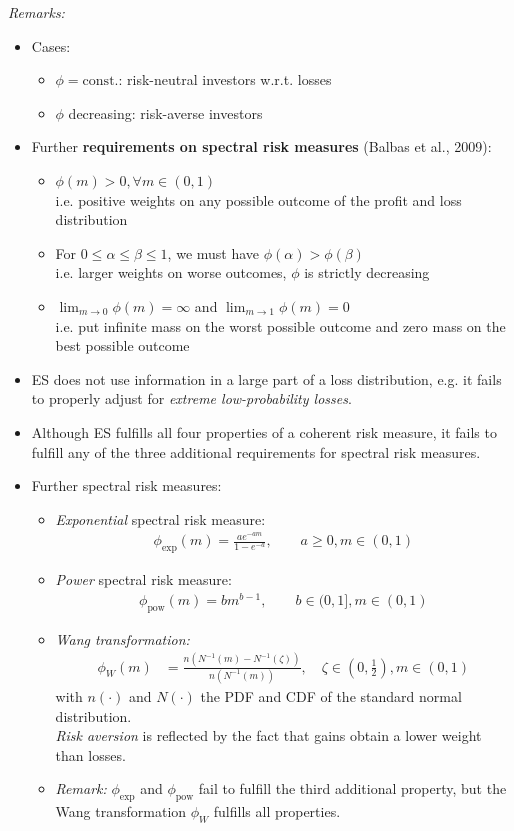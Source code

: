 \documentclass[a4paper,landscape,8pt,fleqn]{scrartcl}
\renewcommand{\emph}[1]{\textbf{#1}}
\begin{document}
\begin{multicols*}{3}
\textit{Remarks:}
\begin{itemize}
\item Cases:
\begin{itemize}
\item $\phi = \text{const.}$: risk-neutral investors w.r.t. losses
\item $\phi$ decreasing: risk-averse investors
\end{itemize}
\item Further \emph{requirements on spectral risk measures} (Balbas et al., 2009):
\begin{itemize}
\item $\phi(m) > 0, \forall m \in (0,1)$ \\
i.e. positive weights on any possible outcome of the profit and loss distribution
\item For $0 \leq \alpha \leq \beta \leq 1$, we must have $\phi(\alpha) > \phi(\beta)$ \\
i.e. larger weights on worse outcomes, $\phi$ is strictly decreasing
\item $\lim_{m \to 0} \phi(m) = \infty$ and $\lim_{m \to 1} \phi(m) = 0$ \\
i.e. put infinite mass on the worst possible outcome and zero mass on the best possible outcome
\end{itemize}
\item ES does not use information in a large part of a loss distribution, e.g. it fails to properly adjust for \textit{extreme low-probability losses}.
\item Although ES fulfills all four properties of a coherent risk measure, it fails to fulfill any of the three additional requirements for spectral risk measures.
\item Further spectral risk measures:
\begin{itemize}
\item \textit{Exponential} spectral risk measure:
\begin{align*}
\phi_\text{exp}(m) = \frac{a e^{-am}}{1-e^{-a}}, \qquad a \geq 0, m \in (0,1)
\end{align*}
\item \textit{Power} spectral risk measure:
\begin{align*}
\phi_\text{pow}(m) = b m^{b-1}, \qquad b \in (0,1], m \in (0,1)
\end{align*}
\item \textit{Wang transformation:}
\begin{align*}
\phi_W(m) &= \frac{n(N^{-1}(m) - N^{-1}(\zeta))}{n(N^{-1}(m))}, \quad \zeta \in \left( 0, \frac{1}{2} \right), m \in (0,1)
\end{align*}
with $n(\cdot)$ and $N(\cdot)$ the PDF and CDF of the standard normal distribution. \\
\textit{Risk aversion} is reflected by the fact that gains obtain a lower weight than losses.
\item \textit{Remark:} $\phi_\text{exp}$ and $\phi_\text{pow}$ fail to fulfill the third additional property, but the Wang transformation $\phi_W$ fulfills all properties.
\end{itemize}
\end{itemize}


\end{multicols*}
\end{document}
